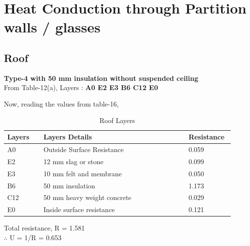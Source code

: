 \documentclass{article}
\begin{document}
\section[Heat Conduction through Partition walls / glasses]{Heat Conduction through Partition walls / glasses}
\subsection{Roof}
\begin{center}
  \textbf{Type-4 with 50 mm insulation without suspended ceiling} \\
  
  From Table-12(a),
  Layers : \textbf{A0 E2 E3 B6 C12 E0} \\ 
\end{center}

Now, reading the values from table-16,

\begin{table}[ht]
  \centering
  \begin{adjustbox}{width=\textwidth}
  \begin{tabularx}{\linewidth}{p{0.15\linewidth} p{0.6\linewidth} p{0.18\linewidth}}
      \hline
      Layers & Layers Details & Resistance \\
      \hline
      A0 & Outside Surface Resistance & 0.059 \\
      E2 & 12 mm slag or stone & 0.099 \\
      E3 & 10 mm felt and membrane & 0.050 \\
      B6 & 50 mm insulation & 1.173 \\
      C12 & 50 mm heavy weight concrete & 0.029 \\
      E0 & Inside surface resistance & 0.121 \\
      \hline
  \end{tabularx}
  \end{adjustbox}
  \caption{Roof Layers}
  \label{tab:Roof}
  \end{table}
  Total resistance, R = 1.581 \\
  \hspace*{0.3cm} $\therefore$ U = 1/R = 0.653 \\

  \vspace{0.5cm}
\end{document}
